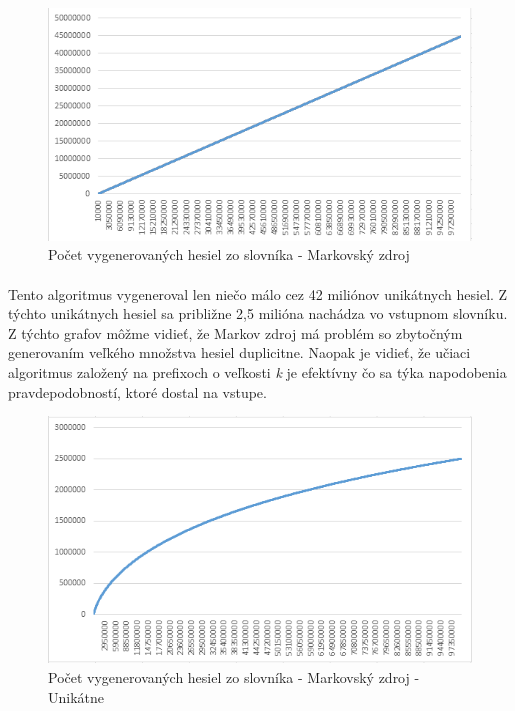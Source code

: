 \begin{figure}[h]
    \centering
    \includegraphics[width=1\textwidth]{Accuracy_mark}
    \caption{Počet vygenerovaných hesiel zo slovníka - Markovský zdroj}
    \label{fig:AccMark}
\end{figure}
\paragraph{}
Tento algoritmus vygeneroval len niečo málo cez 42 miliónov unikátnych hesiel. Z týchto unikátnych hesiel sa približne 2,5 milióna nachádza vo vstupnom slovníku. Z týchto grafov môžme vidieť, že Markov zdroj má problém so zbytočným generovaním veľkého množstva hesiel duplicitne. Naopak je vidieť, že učiaci algoritmus založený na prefixoch o veľkosti \emph{k} je efektívny čo sa týka napodobenia pravdepodobností, ktoré dostal na vstupe.

\begin{figure}[h]
    \centering
    \includegraphics[width=1\textwidth]{Accuracy_mark_uniq}
    \caption{Počet vygenerovaných hesiel zo slovníka - Markovský zdroj - Unikátne}
    \label{fig:AccMarkUniq}
\end{figure}

